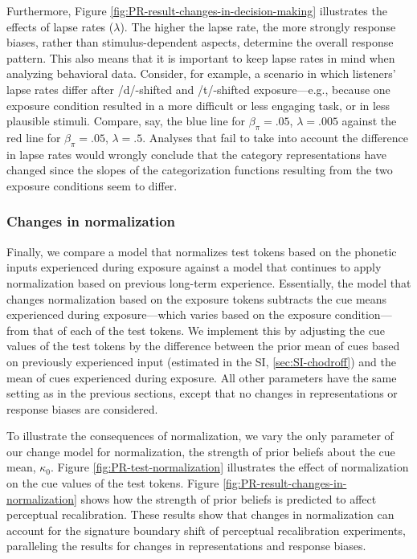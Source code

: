 \documentclass[
  11pt,
  man,floatsintext]{apa6}
\begin{document}
Furthermore, Figure \ref{fig:PR-result-changes-in-decision-making} illustrates the effects of lapse rates (\(\lambda\)). The higher the lapse rate, the more strongly response biases, rather than stimulus-dependent aspects, determine the overall response pattern. This also means that it is important to keep lapse rates in mind when analyzing behavioral data. Consider, for example, a scenario in which listeners' lapse rates differ after /d/-shifted and /t/-shifted exposure---e.g., because one exposure condition resulted in a more difficult or less engaging task, or in less plausible stimuli. Compare, say, the blue line for \(\beta_{\pi} = .05\), \(\lambda = .005\) against the red line for \(\beta_{\pi} = .05\), \(\lambda = .5\). Analyses that fail to take into account the difference in lapse rates would wrongly conclude that the category representations have changed since the slopes of the categorization functions resulting from the two exposure conditions seem to differ.

\hypertarget{changes-in-normalization}{%
\subsubsection{Changes in normalization}\label{changes-in-normalization}}

Finally, we compare a model that normalizes test tokens based on the phonetic inputs experienced during exposure against a model that continues to apply normalization based on previous long-term experience. Essentially, the model that changes normalization based on the exposure tokens subtracts the cue means experienced during exposure---which varies based on the exposure condition---from that of each of the test tokens. We implement this by adjusting the cue values of the test tokens by the difference between the prior mean of cues based on previously experienced input (estimated in the SI, \ref{sec:SI-chodroff}) and the mean of cues experienced during exposure. All other parameters have the same setting as in the previous sections, except that no changes in representations or response biases are considered.

To illustrate the consequences of normalization, we vary the only parameter of our change model for normalization, the strength of prior beliefs about the cue mean, \(\kappa_0\). Figure \ref{fig:PR-test-normalization} illustrates the effect of normalization on the cue values of the test tokens. Figure \ref{fig:PR-result-changes-in-normalization} shows how the strength of prior beliefs is predicted to affect perceptual recalibration. These results show that changes in normalization can account for the signature boundary shift of perceptual recalibration experiments, paralleling the results for changes in representations and response biases.
\end{document}
